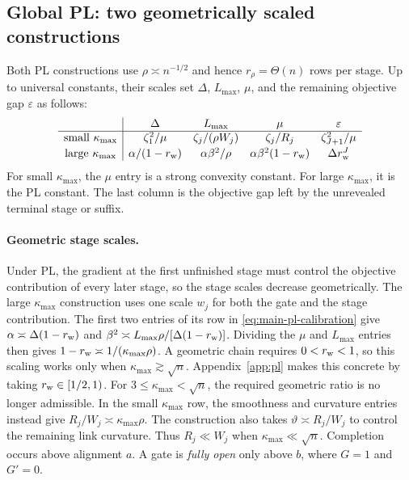 \documentclass{article}
\theoremstyle{definition}
\begin{document}
\subsection{Global PL: two geometrically scaled constructions}

Both PL constructions use $\rho\asymp n^{-1/2}$ and hence
$r_\rho=\Theta(n)$ rows per stage.  Up to universal constants, their scales set
$\Delta$, $L_{\max}$, $\mu$, and the remaining objective gap $\varepsilon$ as
follows:
\begin{equation}
\begin{array}{c|cccc}
 & \Delta & L_{\max} & \mu & \varepsilon\\ \hline
 \text{small }\kappa_{\max}
 & \zeta_1^2/\mu
 & \zeta_j/(\rho W_j)
 & \zeta_j/R_j
 & \zeta_{J+1}^2/\mu\\[2pt]
 \text{large }\kappa_{\max}
 & \alpha/(1-r_{\rm w})
 & \alpha\beta^2/\rho
 & \alpha\beta^2(1-r_{\rm w})
 & \Delta r_{\rm w}^J
\end{array}
\label{eq:main-pl-calibration}
\end{equation}
For small $\kappa_{\max}$, the $\mu$ entry is a strong convexity constant.  For
large $\kappa_{\max}$, it is the PL constant.  The last column is the objective
gap left by the unrevealed terminal stage or suffix.

\paragraph{Geometric stage scales.}
Under PL, the gradient at the first unfinished stage must control the objective
contribution of every later stage, so the stage scales decrease geometrically.
The large $\kappa_{\max}$ construction uses one scale $w_j$ for both the gate
and the stage contribution.  The first two entries of its row in
\eqref{eq:main-pl-calibration} give
$\alpha\asymp\Delta(1-r_{\rm w})$ and
$\beta^2\asymp L_{\max}\rho/[\Delta(1-r_{\rm w})]$.
Dividing the $\mu$ and $L_{\max}$ entries then gives
$1-r_{\rm w}\asymp1/(\kappa_{\max}\rho)$.
A geometric chain requires $0<r_{\rm w}<1$, so this scaling works only
when $\kappa_{\max}\gtrsim\sqrt n$.  Appendix~\ref{app:pl} makes this concrete by
taking $r_{\rm w}\in[1/2,1)$.  For
$3\le\kappa_{\max}<\sqrt n$, the required geometric ratio is no longer
admissible.  In the small $\kappa_{\max}$ row, the smoothness and curvature
entries instead give $R_j/W_j\asymp\kappa_{\max}\rho$.  The construction also
takes $\vartheta\asymp R_j/W_j$ to control the remaining link curvature.  Thus
$R_j\ll W_j$ when $\kappa_{\max}\ll\sqrt n$.  Completion occurs above alignment
$a$.  A gate is \emph{fully open} only above $b$, where $G=1$ and $G'=0$.
\end{document}
